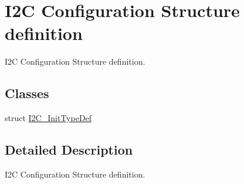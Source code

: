 \hypertarget{group___i2_c___configuration___structure__definition}{}\section{I2C Configuration Structure definition}
\label{group___i2_c___configuration___structure__definition}


I2C Configuration Structure definition.  


\subsection*{Classes}
\begin{DoxyCompactItemize}
\item 
struct \mbox{\hyperlink{struct_i2_c___init_type_def}{I2\+C\+\_\+\+Init\+Type\+Def}}
\end{DoxyCompactItemize}


\subsection{Detailed Description}
I2C Configuration Structure definition. 

